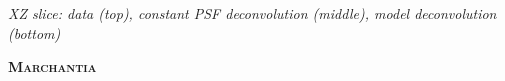 \documentclass[a0paper,portrait,fontscale=0.35]{baposter}
\newcommand{\mycaption}[1]{
  {
    \smaller
    \emph{#1}
  }
}
\theoremstyle{plain}
\theoremstyle{plain}
\theoremstyle{definition}
\theoremstyle{plain}
\theoremstyle{definition}
\begin{document}
\begin{poster}
{\begin{minipage}[t]{0.33\textwidth}
\begin{minipage}[t]{0.85\textwidth}
      \vspace{-0.5em}
      \centering

      \vspace{-1em}
      \begin{center}
        \mycaption{
          XZ slice:
          data (top), constant PSF deconvolution (middle),
          model deconvolution (bottom)
        }
      \end{center}
    \end{minipage}
  \end{minipage}
  \begin{minipage}[t]{0.33\textwidth}
    \begin{center}
      \larger
      \textbf{\textsc{Marchantia}}
    \end{center}


\end{minipage}}
\end{poster}
\end{document}

